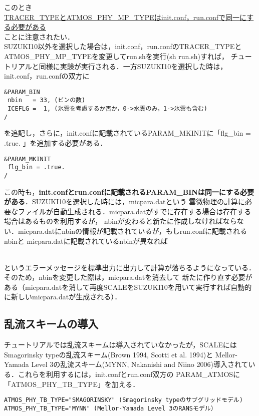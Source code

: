 このとき\\
\underline{{TRACER\_TYPEとATMOS\_PHY\_MP\_TYPEはinit.conf，run.confで同一にする必要がある}}\\
ことに注意されたい．\\
SUZUKI10以外を選択した場合は，init.conf，run.confのTRACER\_TYPEとATMOS\_PHY\_MP\_TYPEを変更してrun.shを実行(sh run.sh)すれば，
チュートリアルと同様に実験が実行される．一方SUZUKI10を選択した時は，init.conf，run.confの双方に

\begin{verbatim}
&PARAM_BIN
 nbin   = 33, (ビンの数)
 ICEFLG =  1, (氷雲を考慮するか否か，0->水雲のみ，1->氷雲も含む)
/
\end{verbatim}

を追記し，さらに，init.confに記載されているPARAM\_MKINITに「flg\_bin = .true. 」を追加する必要がある．

\begin{verbatim}
&PARAM_MKINIT
 flg_bin = .true.
/
\end{verbatim}

この時も，{\bf init.confとrun.confに記載されるPARAM\_BINは同一にする必要がある}．SUZUKI10を選択した時には，micpara.datという
雲微物理の計算に必要なファイルが自動生成される．micpara.datがすでに存在する場合は存在する場合はあるものを利用するが，
nbinが変わると新たに作成しなければならない．micpara.datにnbinの情報が記載されているが，もしrun.confに記載されるnbinと
micpara.datに記載されているnbinが異なれば

\\

というエラーメッセージを標準出力に出力して計算が落ちるようになっている．そのため，nbinを変更した際は，micpara.datを消去して
新たに作り直す必要がある（micpara.datを消して再度SCALEをSUZUKI10を用いて実行すれば自動的に新しいmicpara.datが生成される）．

\subsection{乱流スキームの導入}
チュートリアルでは乱流スキームは導入されていなかったが，SCALEにはSmagorinsky typeの乱流スキーム(Brown 1994, Scotti et al. 1994)と
Mellor-Yamada Level 3の乱流スキーム(MYNN, Nakanishi and Niino 2006)導入されている．これらを利用するには，init.confとrun.conf双方の
PARAM\_ATMOSに「ATMOS\_PHY\_TB\_TYPE」を加える．

\begin{verbatim}
ATMOS_PHY_TB_TYPE="SMAGORINSKY" (Smagorinsky typeのサブグリッドモデル)
ATMOS_PHY_TB_TYPE="MYNN" (Mellor-Yamada Level 3のRANSモデル）
\end{verbatim}

